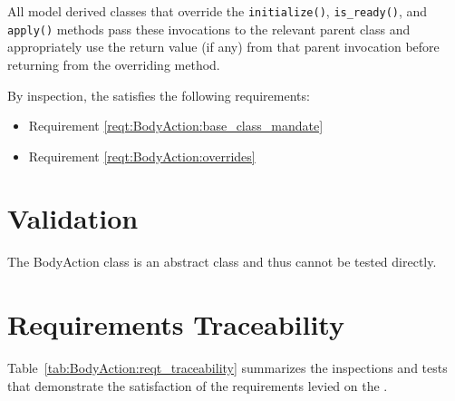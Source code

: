 All model derived classes that override
the {\tt initialize()}, {\tt is\_ready()}, and {\tt apply()}
methods pass these invocations to the relevant parent class
and appropriately use the return value (if any) from that parent invocation
before returning from the overriding method.

By inspection, the \ModelDesc satisfies the following requirements:
\begin{itemize}
\item Requirement \ref{reqt:BodyAction:base_class_mandate}
\item Requirement \ref{reqt:BodyAction:overrides}
\end{itemize}

\section{Validation}
The BodyAction class is an abstract class and thus cannot be tested
directly.

\section{Requirements Traceability}
Table~\ref{tab:BodyAction:reqt_traceability}
summarizes the inspections and tests that demonstrate the satisfaction of the
requirements levied on the \partxname.

